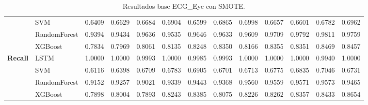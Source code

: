\begin{table}[h]
\begin{adjustbox}{max width=15cm}
\begin{tabular}{|c|l|r|r|r|r|r|r|r|r|r|r|r|}
			& SVM &  0.6409 &  0.6629 &  0.6684 &  0.6904 &  0.6599 &  0.6865 &  0.6998 &  0.6657 &  0.6601 &  0.6782 &  0.6962 \\
			& RandomForest &  0.9394 &  0.9434 &  0.9636 &  0.9535 &  0.9646 &  0.9633 &  0.9609 &  0.9709 &  0.9792 &  0.9811 &  0.9759 \\
			& XGBoost &  0.7834 &  0.7969 &  0.8061 &  0.8135 &  0.8248 &  0.8350 &  0.8166 &  0.8355 &  0.8351 &  0.8469 &  0.8457 \\
			\hline
			\textbf{Recall} & LSTM &  1.0000 &  1.0000 &  0.9993 &  1.0000 &  0.9985 &  0.9993 &  1.0000 &  1.0000 &  1.0000 &  0.9940 &  1.0000 \\
			& SVM &  0.6116 &  0.6398 &  0.6709 &  0.6783 &  0.6905 &  0.6701 &  0.6713 &  0.6775 &  0.6835 &  0.7046 &  0.6731 \\
			& RandomForest &  0.9152 &  0.9257 &  0.9021 &  0.9339 &  0.9443 &  0.9368 &  0.9560 &  0.9559 &  0.9571 &  0.9573 &  0.9465 \\
			& XGBoost &  0.7898 &  0.8004 &  0.7893 &  0.8243 &  0.8385 &  0.8075 &  0.8226 &  0.8262 &  0.8357 &  0.8433 &  0.8654 \\
			\hline
		\end{tabular}
	\end{adjustbox}
	\caption{Resultados base EGG\_Eye con SMOTE.}
	\label{tab:EGGEyeSMOTE}
\end{table}
\newpage
